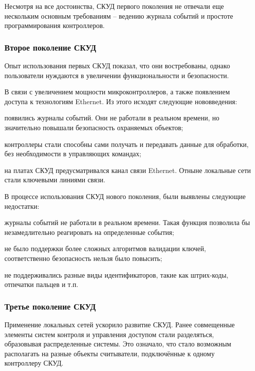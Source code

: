 Несмотря на все достоинства, СКУД первого поколения не отвечали еще нескольким основным требованиям -- ведению журнала событий и простоте программирования контроллеров.

\subsubsection{Второе поколение СКУД}

Опыт использования первых СКУД показал, что они востребованы, однако пользователи нуждаются в увеличении функциональности и безопасности.

В связи с увеличением мощности микроконтроллеров, а также появлением доступа к технологиям Ethernet. Из этого исходят следующие нововведения:

\begin{itemize*}
\item появились журналы событий. Они не работали в реальном времени, но значительно повышали безопасность охраняемых объектов;
\item контроллеры стали способны сами получать и передавать данные для обработки, без необходимости в управляющих командах;
\item на платах СКУД предусматривался канал связи Ethernet. Отныне локальные сети стали ключевыми линиями связи.
\end{itemize*}


В процессе использования СКУД нового поколения, были выявлены следующие недостатки:

\begin{itemize*}
\item журналы событий не работали в реальном времени. Такая функция позволила бы незамедлительно реагировать на определенные события;
\item не было поддержки более сложных алгоритмов валидации ключей, соответственно безопасность нельзя было повысить;
\item не поддерживались разные виды идентификаторов, такие как штрих-коды, отпечатки пальцев и т.п.
\end{itemize*}

\subsubsection{Третье поколение СКУД}

Применение локальных сетей ускорило развитие СКУД. Ранее совмещенные элементы систем контроля и управления доступом стали разделяться, образовывая распределенные системы. Это означало, что стало возможным располагать на разные объекты считыватели, подключённые к одному контроллеру СКУД.

